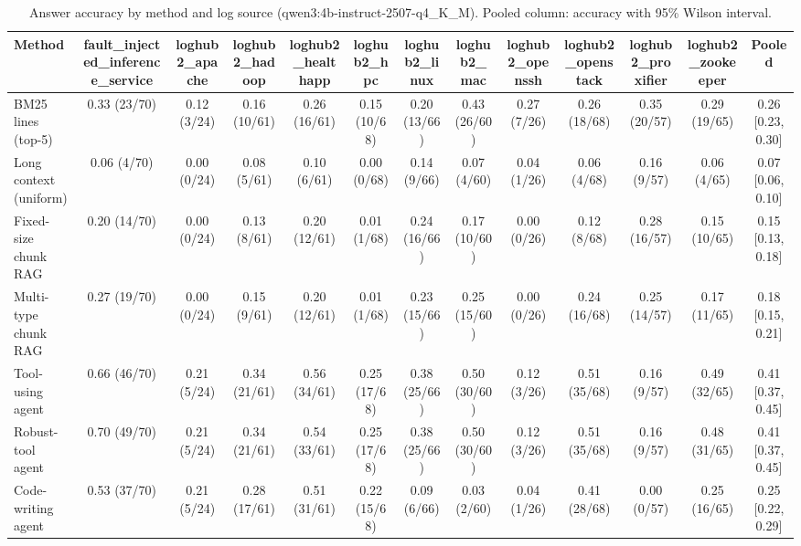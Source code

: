 \begin{table}[t]
\centering
\caption{Answer accuracy by method and log source (qwen3:4b-instruct-2507-q4_K_M). Pooled column: accuracy with 95\% Wilson interval.}
\label{tab:main_comparison__qwen3_4b_instruct}
\begin{tabular}{@{}lcccccccccccc@{}}
\toprule
Method & fault\_injected\_inference\_service & loghub2\_apache & loghub2\_hadoop & loghub2\_healthapp & loghub2\_hpc & loghub2\_linux & loghub2\_mac & loghub2\_openssh & loghub2\_openstack & loghub2\_proxifier & loghub2\_zookeeper & Pooled \\
\midrule
BM25 lines (top-5) & 0.33 (23/70) & 0.12 (3/24) & 0.16 (10/61) & 0.26 (16/61) & 0.15 (10/68) & 0.20 (13/66) & 0.43 (26/60) & 0.27 (7/26) & 0.26 (18/68) & 0.35 (20/57) & 0.29 (19/65) & 0.26 [0.23, 0.30] \\
Long context (uniform) & 0.06 (4/70) & 0.00 (0/24) & 0.08 (5/61) & 0.10 (6/61) & 0.00 (0/68) & 0.14 (9/66) & 0.07 (4/60) & 0.04 (1/26) & 0.06 (4/68) & 0.16 (9/57) & 0.06 (4/65) & 0.07 [0.06, 0.10] \\
Fixed-size chunk RAG & 0.20 (14/70) & 0.00 (0/24) & 0.13 (8/61) & 0.20 (12/61) & 0.01 (1/68) & 0.24 (16/66) & 0.17 (10/60) & 0.00 (0/26) & 0.12 (8/68) & 0.28 (16/57) & 0.15 (10/65) & 0.15 [0.13, 0.18] \\
Multi-type chunk RAG & 0.27 (19/70) & 0.00 (0/24) & 0.15 (9/61) & 0.20 (12/61) & 0.01 (1/68) & 0.23 (15/66) & 0.25 (15/60) & 0.00 (0/26) & 0.24 (16/68) & 0.25 (14/57) & 0.17 (11/65) & 0.18 [0.15, 0.21] \\
Tool-using agent & 0.66 (46/70) & 0.21 (5/24) & 0.34 (21/61) & 0.56 (34/61) & 0.25 (17/68) & 0.38 (25/66) & 0.50 (30/60) & 0.12 (3/26) & 0.51 (35/68) & 0.16 (9/57) & 0.49 (32/65) & 0.41 [0.37, 0.45] \\
Robust-tool agent & 0.70 (49/70) & 0.21 (5/24) & 0.34 (21/61) & 0.54 (33/61) & 0.25 (17/68) & 0.38 (25/66) & 0.50 (30/60) & 0.12 (3/26) & 0.51 (35/68) & 0.16 (9/57) & 0.48 (31/65) & 0.41 [0.37, 0.45] \\
Code-writing agent & 0.53 (37/70) & 0.21 (5/24) & 0.28 (17/61) & 0.51 (31/61) & 0.22 (15/68) & 0.09 (6/66) & 0.03 (2/60) & 0.04 (1/26) & 0.41 (28/68) & 0.00 (0/57) & 0.25 (16/65) & 0.25 [0.22, 0.29] \\
\bottomrule
\end{tabular}
\end{table}
